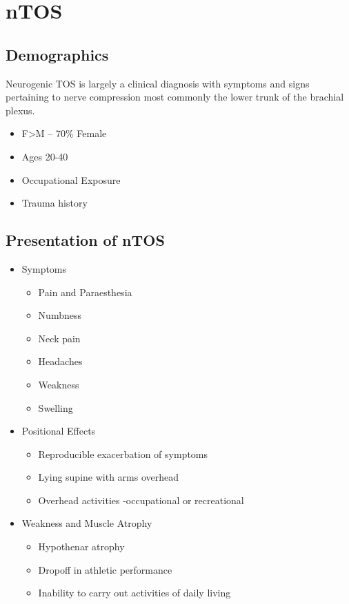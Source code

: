 \documentclass[
]{book}
\begin{document}
\hypertarget{ntos}{%
\section{nTOS}\label{ntos}}

\hypertarget{demographics}{%
\subsection{Demographics}\label{demographics}}

Neurogenic TOS is largely a clinical diagnosis with symptoms and signs
pertaining to nerve compression most commonly the lower trunk of the
brachial plexus.~

\begin{itemize}
\item
  F\textgreater M -- 70\% Female
\item
  Ages 20-40
\item
  Occupational Exposure
\item
  Trauma history
\end{itemize}

\hypertarget{presentation-of-ntos}{%
\subsection{Presentation of nTOS}\label{presentation-of-ntos}}

\begin{itemize}
\item
  Symptoms

  \begin{itemize}
  \item
    Pain and Paraesthesia
  \item
    Numbness
  \item
    Neck pain
  \item
    Headaches
  \item
    Weakness
  \item
    Swelling
  \end{itemize}
\item
  Positional Effects

  \begin{itemize}
  \item
    Reproducible exacerbation of symptoms
  \item
    Lying supine with arms overhead
  \item
    Overhead activities -occupational or recreational
  \end{itemize}
\item
  Weakness and Muscle Atrophy

  \begin{itemize}
  \item
    Hypothenar atrophy
  \item
    Dropoff in athletic performance
  \item
    Inability to carry out activities of daily living~
  \end{itemize}
\end{itemize}
\end{document}
